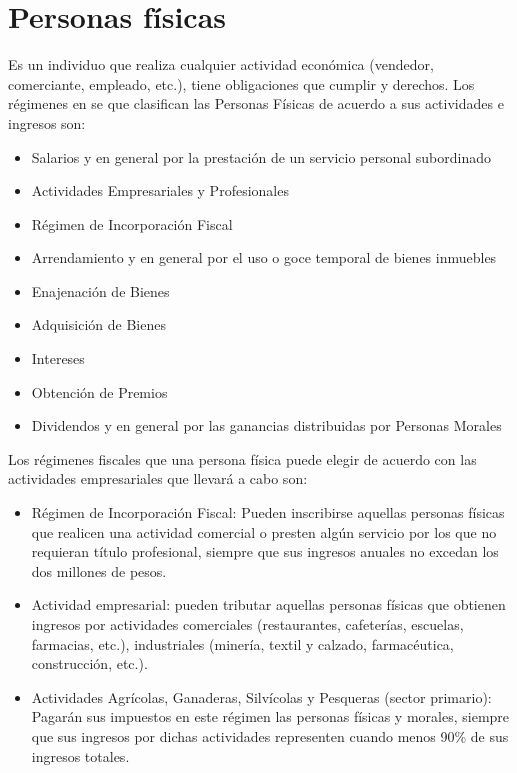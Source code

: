  \newpage

\section{Personas físicas}
Es un individuo que realiza cualquier actividad económica (vendedor, comerciante, empleado, etc.),  tiene obligaciones que cumplir y derechos.
Los régimenes en se que clasifican las Personas Físicas de acuerdo a sus actividades e ingresos son:

\begin{itemize}
  \item  Salarios y en general por la prestación de un servicio personal subordinado
  \item  Actividades Empresariales y Profesionales
  \item  Régimen de Incorporación Fiscal
  \item  Arrendamiento y en general por el uso o goce temporal de bienes inmuebles
  \item Enajenación de Bienes
  \item Adquisición de Bienes
  \item Intereses
  \item Obtención de Premios
  \item Dividendos y en general por las ganancias distribuidas por Personas Morales
\end{itemize}

Los régimenes fiscales \cite{SAT-FISCALES}  que una persona física puede elegir de acuerdo con las actividades empresariales que llevará a cabo son:

\begin{itemize}
  \item Régimen de Incorporación Fiscal: Pueden inscribirse aquellas personas físicas que realicen una actividad comercial o presten algún servicio por los que no requieran título profesional, siempre que sus ingresos anuales no excedan los dos millones de pesos.
  \item Actividad empresarial: pueden tributar aquellas personas físicas que obtienen ingresos por actividades comerciales (restaurantes, cafeterías, escuelas, farmacias, etc.), industriales (minería, textil y calzado, farmacéutica, construcción, etc.).
  \item Actividades Agrícolas, Ganaderas, Silvícolas y Pesqueras (sector primario): Pagarán sus impuestos en este régimen las personas físicas y morales, siempre que sus ingresos por dichas actividades representen cuando menos 90\% de sus ingresos totales.
\end{itemize} %



